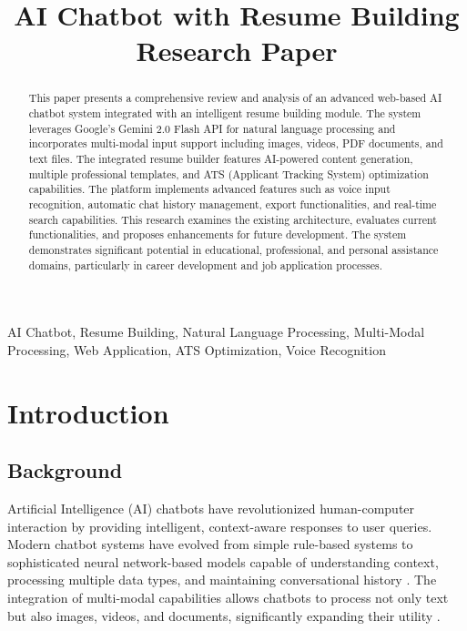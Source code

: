 \documentclass[conference]{IEEEtran}
\begin{document}
\title{AI Chatbot with Resume Building Research Paper}

\author{
}

\maketitle

\begin{abstract}
This paper presents a comprehensive review and analysis of an advanced web-based AI chatbot system integrated with an intelligent resume building module. The system leverages Google's Gemini 2.0 Flash API for natural language processing and incorporates multi-modal input support including images, videos, PDF documents, and text files. The integrated resume builder features AI-powered content generation, multiple professional templates, and ATS (Applicant Tracking System) optimization capabilities. The platform implements advanced features such as voice input recognition, automatic chat history management, export functionalities, and real-time search capabilities. This research examines the existing architecture, evaluates current functionalities, and proposes enhancements for future development. The system demonstrates significant potential in educational, professional, and personal assistance domains, particularly in career development and job application processes.
\end{abstract}

\begin{IEEEkeywords}
AI Chatbot, Resume Building, Natural Language Processing, Multi-Modal Processing, Web Application, ATS Optimization, Voice Recognition
\end{IEEEkeywords}

\section{Introduction}

\subsection{Background}
Artificial Intelligence (AI) chatbots have revolutionized human-computer interaction by providing intelligent, context-aware responses to user queries. Modern chatbot systems have evolved from simple rule-based systems to sophisticated neural network-based models capable of understanding context, processing multiple data types, and maintaining conversational history \cite{adamopoulou2020}. The integration of multi-modal capabilities allows chatbots to process not only text but also images, videos, and documents, significantly expanding their utility \cite{radford2021}.
\end{document}
